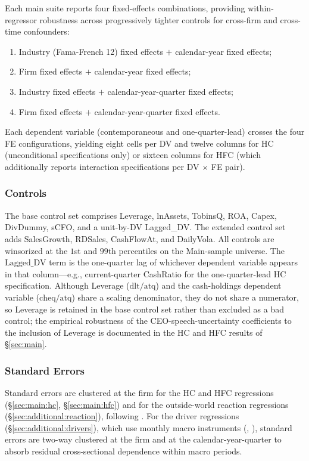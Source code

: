 Each main suite reports four fixed-effects combinations, providing within-regressor robustness across progressively tighter controls for cross-firm and cross-time confounders:
\begin{enumerate}
\item Industry (Fama-French 12) fixed effects $+$ calendar-year fixed effects;
\item Firm fixed effects $+$ calendar-year fixed effects;
\item Industry fixed effects $+$ calendar-year-quarter fixed effects;
\item Firm fixed effects $+$ calendar-year-quarter fixed effects.
\end{enumerate}
Each dependent variable (contemporaneous and one-quarter-lead) crosses the four FE configurations, yielding eight cells per DV and twelve columns for HC (unconditional specifications only) or sixteen columns for HFC (which additionally reports interaction specifications per DV $\times$ FE pair).

\subsubsection{Controls}

The base control set comprises Leverage, lnAssets, TobinsQ, ROA, Capex, DivDummy, sCFO, and a unit-by-DV Lagged\_DV. The extended control set adds SalesGrowth, RDSales, CashFlowAt, and DailyVola. All controls are winsorized at the $1$st and $99$th percentiles on the Main-sample universe. The $\text{Lagged\_DV}$ term is the one-quarter lag of whichever dependent variable appears in that column---e.g., current-quarter CashRatio for the one-quarter-lead HC specification. Although Leverage ($\text{dlt}/\text{atq}$) and the cash-holdings dependent variable ($\text{cheq}/\text{atq}$) share a scaling denominator, they do not share a numerator, so Leverage is retained in the base control set rather than excluded as a bad control; the empirical robustness of the CEO-speech-uncertainty coefficients to the inclusion of Leverage is documented in the HC and HFC results of \S\ref{sec:main}.

\subsubsection{Standard Errors}

Standard errors are clustered at the firm for the HC and HFC regressions (\S\ref{sec:main:hc}, \S\ref{sec:main:hfc}) and for the outside-world reaction regressions (\S\ref{sec:additional:reaction}), following . For the driver regressions (\S\ref{sec:additional:drivers}), which use monthly macro instruments (, ), standard errors are two-way clustered at the firm and at the calendar-year-quarter to absorb residual cross-sectional dependence within macro periods.

